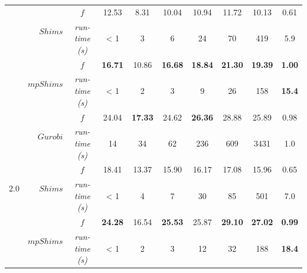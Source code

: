 \documentclass[preprint,authoryear]{elsarticle}
\begin{document}
\begin{table}[H]
\begin{tabular}{crcccccccc}
\cmidrule{2-10}		                       
&\multirow{2}{*}{ $Shims$}                       & $f$                & 12.53       &  8.31       &  10.04      &  10.94      &   11.72     & 10.13        & 0.61 \\%
&                                                & {\it run-time (s)} &  < 1        &  3          &    6        &   24        &   70        &  419         & 5.9 \\%

\cmidrule{2-10}		                       
&\multirow{2}{*}{ $mpShims$}                     & $f$                & {\bf 16.71} & 10.86       & {\bf 16.68} & {\bf 18.84} & {\bf 21.30} & {\bf 19.39}  & {\bf 1.00}  \\%
&                                                & {\it run-time (s)} &  < 1        &  2          &    3        &   9         &   26        &   158        & {\bf 15.4}  \\%

\midrule
\multirow{7}{*}{$2.0$}&\multirow{2}{*}{ $Gurobi$}& $f$                & 24.04       & {\bf 17.33} & 24.62       & {\bf 26.36} &  28.88      & 25.89        & 0.98  \\%
&                                                & {\it run-time (s)} &  14         &   34        &  62         &  236        &   609       & 3431         & 1.0  \\%

\cmidrule{2-10}		                       
&\multirow{2}{*}{ $Shims$}                       & $f$                & 18.41       &  13.37       &  15.90      &  16.17      &   17.08     & 15.96        & 0.65 \\%
&                                                & {\it run-time (s)} &  < 1        &  4          &    7        &   30         &   85        &  501         & 7.0 \\%

\cmidrule{2-10}		                       
&\multirow{2}{*}{ $mpShims$}                     & $f$                & {\bf 24.28} & 16.54       & {\bf 25.53} & 25.87        & {\bf 29.10} & {\bf 27.02}  & {\bf 0.99} \\%
&                                                & {\it run-time (s)} &  < 1        &  2          &    3        &   12         &   32        &   188        & {\bf 18.4}  \\%

\bottomrule	

\end{tabular}
\normalsize
\end{table}
\end{document}
